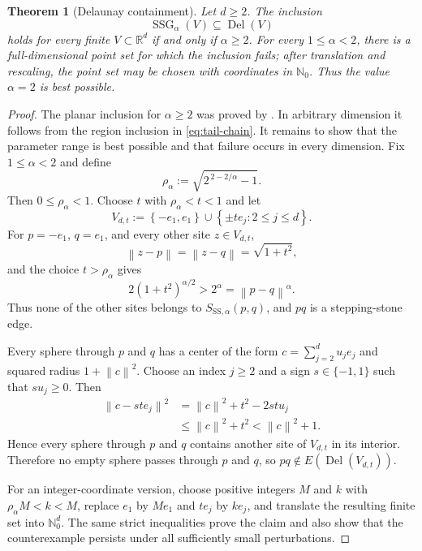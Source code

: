 \documentclass[a4paper,fleqn]{cas-sc}
\newtheorem{theorem}{Theorem}
\theoremstyle{definition}
\theoremstyle{remark}
\newcommand{\R}{\mathds{R}}
\newcommand{\Nzero}{\mathds{N}_0}
\newcommand{\norm}[1]{\left\lVert #1\right\rVert}
\newcommand{\set}[1]{\left\{#1\right\}}
\newcommand{\0}{\mathbf{0}}
\DeclareMathOperator{\SSG}{SSG}
\DeclareMathOperator{\Del}{Del}
\begin{document}
\begin{theorem}[Delaunay containment]
\label{thm:sharp-delaunay}
Let $d\geq2$. The inclusion
\begin{equation}
    \SSG_\alpha(V)\subseteq\Del(V)
\end{equation}
holds for every finite $V\subset\R^d$ if and only if $\alpha\geq2$.
For every $1\leq\alpha<2$, there is a full-dimensional point set for which
the inclusion fails; after translation and rescaling, the point set may be
chosen with coordinates in $\Nzero$. Thus the value $\alpha=2$ is best
possible.
\end{theorem}

\begin{proof}
The planar inclusion for $\alpha\geq2$ was proved by
\citet[Theorem~3.11]{kannangara2018stepping}. In arbitrary dimension it
follows from the region inclusion in \eqref{eq:tail-chain}. It remains to
show that the parameter range is best possible and that failure occurs in
every dimension. Fix $1\leq\alpha<2$ and define
\begin{equation}
    \rho_\alpha
    :=\sqrt{2^{\,2-2/\alpha}-1}.
\end{equation}
Then $0\leq\rho_\alpha<1$. Choose $t$ with
$\rho_\alpha<t<1$ and let
\begin{equation}\label{eq:delaunay-counterexample}
    V_{d,t}
    :=\set{-e_1,e_1}
      \cup\set{\pm t e_j:2\leq j\leq d}.
\end{equation}
For $p=-e_1$, $q=e_1$, and every other site $z\in V_{d,t}$,
\begin{equation}
    \norm{z-p}=\norm{z-q}=\sqrt{1+t^2},
\end{equation}
and the choice $t>\rho_\alpha$ gives
\begin{equation}
    2(1+t^2)^{\alpha/2}>2^\alpha=\norm{p-q}^\alpha.
\end{equation}
Thus none of the other sites belongs to
$S_{\mathrm{SS},\alpha}(p,q)$, and $pq$ is a stepping-stone edge.

Every sphere through $p$ and $q$ has a center of the form
$c=\sum_{j=2}^d u_j e_j$ and squared radius
$1+\norm{c}^2$. Choose an index $j\geq2$ and a sign
$s\in\{-1,1\}$ such that $s u_j\geq0$. Then
\begin{equation}
\begin{split}
    \norm{c-s t e_j}^2
    &=\norm{c}^2+t^2-2s t u_j\\
    &\leq\norm{c}^2+t^2
    <\norm{c}^2+1.
\end{split}
\end{equation}
Hence every sphere through $p$ and $q$ contains another site of
$V_{d,t}$ in its interior. Therefore no empty sphere passes through $p$ and
$q$, so
$pq\notin E(\Del(V_{d,t}))$.

For an integer-coordinate version, choose positive integers $M$ and $k$
with $\rho_\alpha M<k<M$, replace $e_1$ by $M e_1$ and $t e_j$ by
$k e_j$, and translate the resulting finite set into $\Nzero^d$. The same
strict inequalities prove the claim and also show that the counterexample
persists under all sufficiently small perturbations.
\end{proof}
\end{document}
